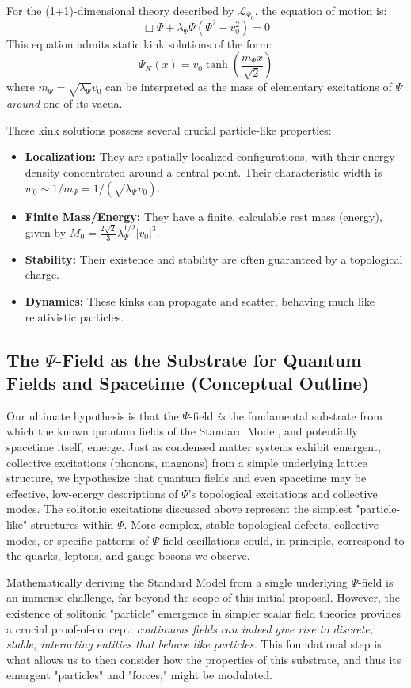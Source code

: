 \documentclass[11pt, a4paper]{book}
\begin{document}
For the (1+1)-dimensional theory described by $\mathcal{L}_{\Psi_0}$, the equation of motion is:
\[ \Box \Psi + \lambda_\Psi \Psi (\Psi^2 - v_0^2) = 0 \]
This equation admits static kink solutions of the form:
\[ \Psi_K(x) = v_0 \tanh\left(\frac{m_\Psi x}{\sqrt{2}}\right) \]
where $m_\Psi = \sqrt{\lambda_\Psi} v_0$ can be interpreted as the mass of elementary excitations of $\Psi$ \emph{around} one of its vacua.

These kink solutions possess several crucial particle-like properties:
\begin{itemize}
    \item \textbf{Localization:} They are spatially localized configurations, with their energy density concentrated around a central point. Their characteristic width is $w_0 \sim 1/m_\Psi = 1/(\sqrt{\lambda_\Psi} v_0)$.
    \item \textbf{Finite Mass/Energy:} They have a finite, calculable rest mass (energy), given by $M_0 = \frac{2\sqrt{2}}{3} \lambda_\Psi^{1/2} |v_0|^3$.
    \item \textbf{Stability:} Their existence and stability are often guaranteed by a topological charge.
    \item \textbf{Dynamics:} These kinks can propagate and scatter, behaving much like relativistic particles.
\end{itemize}

\subsection{The $\Psi$-Field as the Substrate for Quantum Fields and Spacetime (Conceptual Outline)}
\label{ssec:psisubstrate_qftemergence}
Our ultimate hypothesis is that the $\Psi$-field \emph{is} the fundamental substrate from which the known quantum fields of the Standard Model, and potentially spacetime itself, emerge. Just as condensed matter systems exhibit emergent, collective excitations (phonons, magnons) from a simple underlying lattice structure, we hypothesize that quantum fields and even spacetime may be effective, low-energy descriptions of $\Psi$’s topological excitations and collective modes. The solitonic excitations discussed above represent the simplest "particle-like" structures within $\Psi$. More complex, stable topological defects, collective modes, or specific patterns of $\Psi$-field oscillations could, in principle, correspond to the quarks, leptons, and gauge bosons we observe.

Mathematically deriving the Standard Model from a single underlying $\Psi$-field is an immense challenge, far beyond the scope of this initial proposal. However, the existence of solitonic "particle" emergence in simpler scalar field theories provides a crucial proof-of-concept: \emph{continuous fields can indeed give rise to discrete, stable, interacting entities that behave like particles.} This foundational step is what allows us to then consider how the properties of this substrate, and thus its emergent "particles" and "forces," might be modulated.
\end{document}
